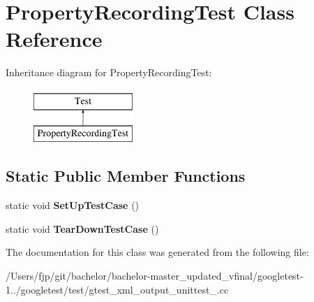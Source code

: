 \hypertarget{class_property_recording_test}{}\section{Property\+Recording\+Test Class Reference}
\label{class_property_recording_test}
Inheritance diagram for Property\+Recording\+Test\+:\begin{figure}[H]
\begin{center}
\leavevmode
\includegraphics[height=2.000000cm]{class_property_recording_test}
\end{center}
\end{figure}
\subsection*{Static Public Member Functions}
\begin{DoxyCompactItemize}
\item 
\mbox{\label{class_property_recording_test_a673c9dfcd9f0c8d10d0df765852c1669}} 
static void {\bfseries Set\+Up\+Test\+Case} ()
\item 
\mbox{\label{class_property_recording_test_ac0d2d47efbdc4399777dffca6071d15d}} 
static void {\bfseries Tear\+Down\+Test\+Case} ()
\end{DoxyCompactItemize}


The documentation for this class was generated from the following file\+:\begin{DoxyCompactItemize}
\item 
/\+Users/fjp/git/bachelor/bachelor-\/master\+\_\+updated\+\_\+vfinal/googletest-\/1../googletest/test/gtest\+\_\+xml\+\_\+output\+\_\+unittest\+\_\+.\+cc\end{DoxyCompactItemize}
